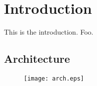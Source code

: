 \documentclass[main.tex]{subfiles}
\begin{document}
\section{Introduction}
This is the introduction. Foo. \cite{steedman}

\subsection{Architecture}
\begin{figure}[h]
    \texttt{[image: arch.eps]}

\end{figure}
\end{document}
